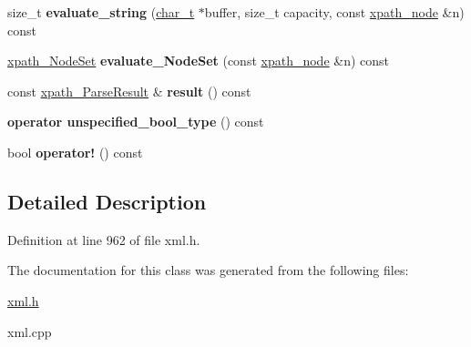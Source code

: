 \begin{DoxyCompactItemize}
\item 
\hypertarget{classphys_1_1xml_1_1xpath__query_a6c976cc4bd67c68db71a6d655f4e16f2}{
size\_\-t {\bfseries evaluate\_\-string} (\hyperlink{namespacephys_1_1xml_afc87705cd1c2917d87b879715a2d8f6e}{char\_\-t} $\ast$buffer, size\_\-t capacity, const \hyperlink{classphys_1_1xml_1_1xpath__node}{xpath\_\-node} \&n) const }
\label{de/d9e/classphys_1_1xml_1_1xpath__query_a6c976cc4bd67c68db71a6d655f4e16f2}

\item 
\hypertarget{classphys_1_1xml_1_1xpath__query_a08eda816ba85929bd0cb5b038220cb12}{
\hyperlink{classphys_1_1xml_1_1xpath__NodeSet}{xpath\_\-NodeSet} {\bfseries evaluate\_\-NodeSet} (const \hyperlink{classphys_1_1xml_1_1xpath__node}{xpath\_\-node} \&n) const }
\label{de/d9e/classphys_1_1xml_1_1xpath__query_a08eda816ba85929bd0cb5b038220cb12}

\item 
\hypertarget{classphys_1_1xml_1_1xpath__query_a1b57c9d69fff49b94b03ad33132d8531}{
const \hyperlink{structphys_1_1xml_1_1xpath__ParseResult}{xpath\_\-ParseResult} \& {\bfseries result} () const }
\label{de/d9e/classphys_1_1xml_1_1xpath__query_a1b57c9d69fff49b94b03ad33132d8531}

\item 
\hypertarget{classphys_1_1xml_1_1xpath__query_a97998963246521002d11ba405f8e6b32}{
{\bfseries operator unspecified\_\-bool\_\-type} () const }
\label{de/d9e/classphys_1_1xml_1_1xpath__query_a97998963246521002d11ba405f8e6b32}

\item 
\hypertarget{classphys_1_1xml_1_1xpath__query_ae06c5426b9e32143b1881cf12af50390}{
bool {\bfseries operator!} () const }
\label{de/d9e/classphys_1_1xml_1_1xpath__query_ae06c5426b9e32143b1881cf12af50390}

\end{DoxyCompactItemize}


\subsection{Detailed Description}


Definition at line 962 of file xml.h.



The documentation for this class was generated from the following files:\begin{DoxyCompactItemize}
\item 
\hyperlink{xml_8h}{xml.h}\item 
xml.cpp\end{DoxyCompactItemize}

